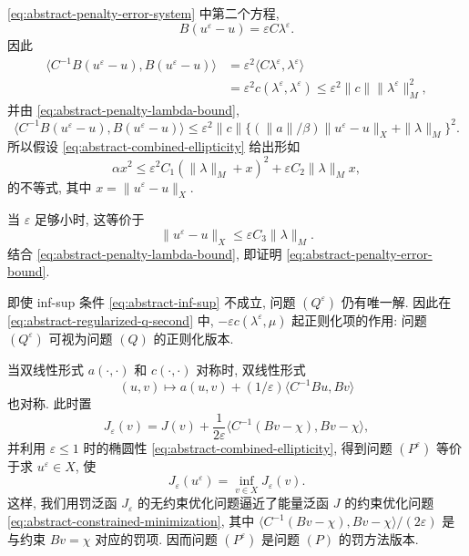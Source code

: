 \begin{Proof}
\eqref{eq:abstract-penalty-error-system} 中第二个方程,
\[
B(u^\varepsilon-u)=\varepsilon C\lambda^\varepsilon.
\]
因此
\[
\begin{aligned}
\langle C^{-1}B(u^\varepsilon-u),B(u^\varepsilon-u)\rangle
&=\varepsilon^2\langle C\lambda^\varepsilon,
\lambda^\varepsilon\rangle\\
&=\varepsilon^2c(\lambda^\varepsilon,\lambda^\varepsilon)
\le\varepsilon^2\|c\|\|\lambda^\varepsilon\|_M^2,
\end{aligned}
\]
并由 
\eqref{eq:abstract-penalty-lambda-bound},
\[
\langle C^{-1}B(u^\varepsilon-u),B(u^\varepsilon-u)\rangle
\le\varepsilon^2\|c\|
\{(\|a\|/\beta)\|u^\varepsilon-u\|_X+\|\lambda\|_M\}^2.
\]
所以假设 
\eqref{eq:abstract-combined-ellipticity} 给出形如
\[
\alpha x^2\le\varepsilon^2C_1(\|\lambda\|_M+x)^2
+\varepsilon C_2\|\lambda\|_Mx,
\]
的不等式, 其中 $x=\|u^\varepsilon-u\|_X$.

当 $\varepsilon$ 足够小时, 这等价于
\[
\|u^\varepsilon-u\|_X\le\varepsilon C_3\|\lambda\|_M.
\]
结合 
\eqref{eq:abstract-penalty-lambda-bound}, 即证明
\eqref{eq:abstract-penalty-error-bound}.
\end{Proof}

\setcounter{statement}{2}
\begin{Remark}\label{rem:abstract-regularization-without-infsup}
即使 inf-sup 条件 
\eqref{eq:abstract-inf-sup} 不成立, 问题 $(Q^\varepsilon)$ 仍有唯一解.
因此在 
\eqref{eq:abstract-regularized-q-second} 中,
$-\varepsilon c(\lambda^\varepsilon,\mu)$ 起正则化项的作用:
问题 $(Q^\varepsilon)$ 可视为问题 $(Q)$ 的正则化版本.
\end{Remark}

\setcounter{statement}{3}
\begin{Remark}\label{rem:abstract-penalized-functional}
当双线性形式 $a(\cdot,\cdot)$ 和 $c(\cdot,\cdot)$ 对称时,
双线性形式
\[
(u,v)\longmapsto a(u,v)+(1/\varepsilon)
\langle C^{-1}Bu,Bv\rangle
\]
也对称. 此时置
\[
J_\varepsilon(v)=J(v)+\frac1{2\varepsilon}
\langle C^{-1}(Bv-\chi),Bv-\chi\rangle,
\]
并利用 $\varepsilon\le1$ 时的椭圆性
\eqref{eq:abstract-combined-ellipticity}, 得到问题 $(P^\varepsilon)$
等价于求 $u^\varepsilon\in X$, 使
\[
J_\varepsilon(u^\varepsilon)=\inf_{v\in X}J_\varepsilon(v).
\]
这样, 我们用罚泛函 $J_\varepsilon$ 的无约束优化问题逼近了能量泛函 $J$
的约束优化问题 
\eqref{eq:abstract-constrained-minimization}, 其中
$\langle C^{-1}(Bv-\chi),Bv-\chi\rangle/(2\varepsilon)$
是与约束 $Bv=\chi$ 对应的罚项. 因而问题 $(P^\varepsilon)$ 是问题 $(P)$ 的罚方法版本.
\end{Remark}

